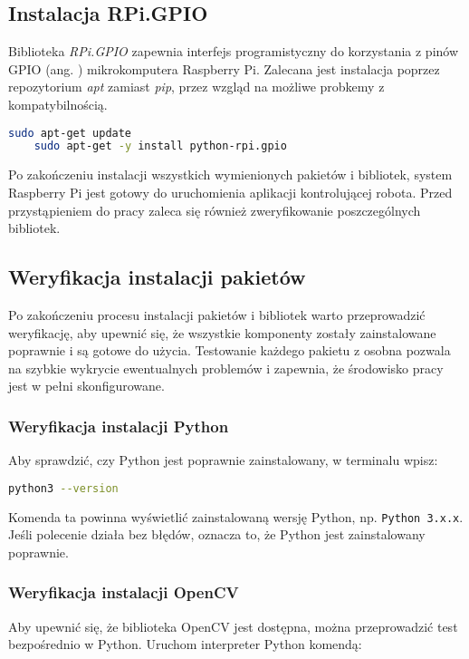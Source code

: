 \subsection{Instalacja RPi.GPIO}
Biblioteka \textit{RPi.GPIO} zapewnia interfejs programistyczny do korzystania z pinów GPIO (ang. ) mikrokomputera Raspberry Pi. Zalecana jest instalacja poprzez repozytorium \textit{apt} zamiast \textit{pip}, przez wzgląd na możliwe probkemy z kompatybilnością.

\begin{lstlisting}[language=bash]
    sudo apt-get update
    sudo apt-get -y install python-rpi.gpio
\end{lstlisting}

\vspace*{1cm}

Po zakończeniu instalacji wszystkich wymienionych pakietów i bibliotek, system Raspberry Pi jest gotowy do uruchomienia aplikacji kontrolującej robota. Przed przystąpieniem do pracy zaleca się również zweryfikowanie poszczególnych bibliotek.

\subsection{Weryfikacja instalacji pakietów}

Po zakończeniu procesu instalacji pakietów i bibliotek warto przeprowadzić weryfikację, aby upewnić się, że wszystkie komponenty zostały zainstalowane poprawnie i są gotowe do użycia. Testowanie każdego pakietu z osobna pozwala na szybkie wykrycie ewentualnych problemów i zapewnia, że środowisko pracy jest w pełni skonfigurowane.

\subsubsection{Weryfikacja instalacji Python}
Aby sprawdzić, czy Python jest poprawnie zainstalowany, w terminalu wpisz:

\begin{lstlisting}[language=bash]
python3 --version
\end{lstlisting}

Komenda ta powinna wyświetlić zainstalowaną wersję Python, np. \texttt{Python 3.x.x}. Jeśli polecenie działa bez błędów, oznacza to, że Python jest zainstalowany poprawnie.

\subsubsection{Weryfikacja instalacji OpenCV}
Aby upewnić się, że biblioteka OpenCV jest dostępna, można przeprowadzić test bezpośrednio w Python. Uruchom interpreter Python komendą:


